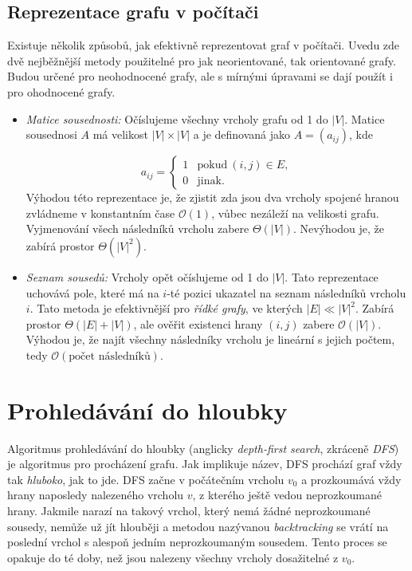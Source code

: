 \documentclass[12pt]{report}			%
\begin{document}
			
			\subsection{Reprezentace grafu v počítači}
Existuje několik způsobů, jak efektivně reprezentovat graf v počítači. %
Uvedu zde dvě nejběžnější metody použitelné pro jak neorientované, tak orientované grafy. Budou určené pro neohodnocené grafy, ale s mírnými úpravami se dají použít i pro ohodnocené grafy.

\begin{itemize}
	\item \emph{Matice sousednosti:} Očíslujeme všechny vrcholy grafu od 1 do $|V|$. Matice sousednosi $A$ má velikost $|V| \times |V|$ a je definovaná jako $A = (a_{ij})$, kde
	
    $$a_{ij}=
    \begin{cases}
      1 & \text{pokud}\ (i,j)\in E, \\
      0 & \text{jinak}.
    \end{cases}$$
  Výhodou této reprezentace je, že zjistit zda jsou dva vrcholy spojené hranou zvládneme v konstantním čase $\mathcal{O}(1)$, vůbec nezáleží na velikosti grafu. Vyjmenování všech následníků vrcholu zabere $\Theta(|V|)$. Nevýhodou je, že zabírá prostor $\Theta(|V|^2)$.
	
	\item \emph{Seznam sousedů:} Vrcholy opět očíslujeme od 1 do $|V|$. Tato reprezentace uchovává pole, které má na $i$-té pozici ukazatel na seznam následníků vrcholu $i$. %
	Tato metoda je efektivnější pro \emph{řídké grafy}, ve kterých $|E| \ll |V|^2$. Zabírá prostor $\Theta(|E|+|V|)$, ale ověřit existenci hrany $(i,j)$ zabere $\mathcal{O}(|V|)$. Výhodou je, že najít všechny následníky vrcholu je lineární s jejich počtem, tedy $\mathcal{O}(\textrm{počet následníků})$.%
	

\end{itemize}



			\section{Prohledávání do hloubky}
			Algoritmus prohledávání do hloubky (anglicky \emph{depth-first search}, zkráceně \emph{DFS}) je algoritmus pro procházení grafu. Jak implikuje název, DFS prochází graf vždy tak \emph{hluboko}, jak to jde. DFS začne v počátečním vrcholu $v_0$ a prozkoumává vždy hrany naposledy nalezeného vrcholu $v$, z kterého ještě vedou neprozkoumané hrany. Jakmile narazí na takový vrchol, který nemá žádné neprozkoumané sousedy, nemůže už jít hlouběji a metodou nazývanou \emph{backtracking} se vrátí na poslední vrchol s alespoň jedním neprozkoumaným sousedem. Tento proces se opakuje do té doby, než jsou nalezeny všechny vrcholy dosažitelné z $v_0$.
\end{document}
